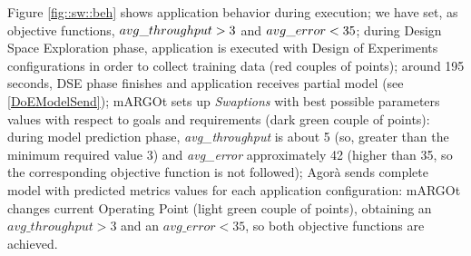 Figure \ref{fig::sw::beh} shows application behavior during execution; we have set, as objective functions, $avg\_\-throughput > 3$ and $avg\_\-error < 35$; during Design Space Exploration phase, application is executed with Design of Experiments configurations in order to collect training data (red couples of points); around 195 seconds, DSE phase finishes and application receives partial model (see \ref{DoEModelSend}); mARGOt sets up \textit{Swaptions} with best possible parameters values with respect to goals and requirements (dark green couple of points): during model prediction phase, \textit{avg\_throughput} is about 5 (so, greater than the minimum required value 3) and \textit{avg\_error} approximately 42 (higher than 35, so the corresponding objective function is not followed); Agorà sends complete model with predicted metrics values for each application configuration: mARGOt changes current Operating Point (light green couple of points), obtaining an $avg\_throughput > 3$ and an $avg\_error < 35$, so both objective functions are achieved. 
